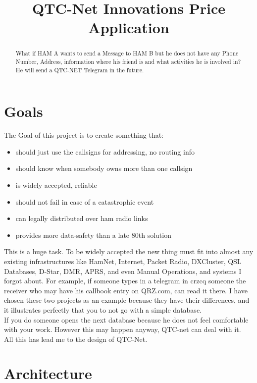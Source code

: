 \documentclass{article}
\title{QTC-Net Innovations Price Application}
\begin{document}
\maketitle


\begin{abstract}
What if HAM A wants to send a Message to HAM B but he does not have any 
Phone Number, Address, information where his friend is and what activities 
he is involved in? He will send a QTC-NET Telegram in the future. 
\end{abstract}

\section{Goals}

The Goal of this project is to create something that:

\begin{itemize}
	\item should just use the callsigns for addressing, no routing info 
	\item should know when somebody owns more than one callsign
	\item is widely accepted, reliable
	\item should not fail in case of a catastrophic event
	\item can legally distributed over ham radio links
	\item provides more data-safety than a late 80th solution
\end{itemize}

This is a huge task. To be widely accepted the new thing must fit into almost 
any existing infrastructures like HamNet, Internet, Packet Radio, DXCluster, 
QSL Databases, D-Star, DMR, APRS, and even Manual Operations, and systems I 
forgot about. For example, if someone types in a telegram in crzcq someone 
the receiver who may have his callbook entry on QRZ.com, can read it there. 
I have chosen these two projects as an example because they have their 
differences, and it illustrates perfectly that you to not go with a simple 
database. \\

If you do someone opens the next database because he does not feel 
comfortable with your work. However this may happen anyway, QTC-net can deal 
with it. \\

All this has lead me to the design of QTC-Net.  


\section{Architecture}
\end{document}
